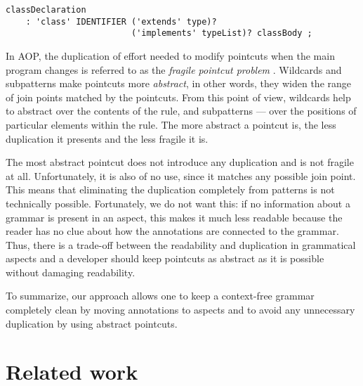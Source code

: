 \documentclass{IOS-Book-Article}     %
\newcommand{\bad}[1]{\textcolor{red}{#1}}
\renewcommand{\bad}[1]{#1}
\begin{document}
\begin{lstlisting}[language=Grammatic,caption=Class declaration rule in Java 1.4,label=java_14,float]
classDeclaration
	: 'class' IDENTIFIER ('extends' type)? 
                         ('implements' typeList)? classBody ;
\end{lstlisting}

In AOP, the duplication of effort needed to modify pointcuts when the main program changes is referred to as the \emph{fragile pointcut problem} \cite{Fragile}. Wildcards and subpatterns make pointcuts more \emph{abstract}, in other words, they widen the range of join points matched by the pointcuts. From this point of view, wildcards help to abstract over the contents of the rule, and subpatterns --- over the positions of particular elements within the rule. The more abstract a pointcut is, the less duplication it presents and the less fragile it is. 

The most abstract pointcut does not introduce any duplication and is not fragile at all. Unfortunately, it is also of no use, since it matches any possible join point. This means that eliminating the duplication completely from patterns is not technically possible. Fortunately, we do not want this: if no information about a grammar is present in an aspect, this makes it much less readable because the reader has no clue about how the annotations are connected to the grammar. Thus, there is a trade-off between the readability and duplication in grammatical aspects and a developer should keep pointcuts as abstract as it is possible without \bad{damaging} readability.

To summarize, our approach allows one to keep a context-free grammar completely clean by moving annotations to aspects and to avoid any unnecessary duplication by using abstract pointcuts. 

\section{Related work}\label{Related}
\end{document}
